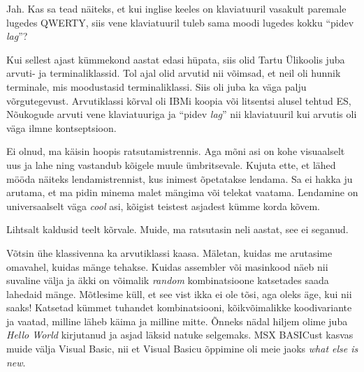 
Jah. Kas sa tead näiteks, et kui inglise keeles on klaviatuuril vasakult paremale lugedes 
QWERTY, siis vene klaviatuuril tuleb sama moodi lugedes kokku \enquote{pidev \emph{lag}}? 


Kui sellest ajast kümmekond aastat edasi hüpata, siis olid Tartu Ülikoolis juba arvuti- ja 
terminaliklassid. Tol ajal olid arvutid nii võimsad, et neil oli 
hunnik terminale, mis moodustasid terminaliklassi. Siis oli juba ka
väga palju võrgutegevust. Arvutiklassi kõrval oli 
IBMi koopia või litsentsi alusel tehtud ES, Nõukogude arvuti vene klaviatuuriga ja \enquote{pidev \emph{lag}} nii klaviatuuril kui arvutis oli väga ilmne kontseptsioon.


Ei olnud, ma käisin hoopis ratsutamistrennis. Aga mõni 
asi on kohe visuaalselt uus ja lahe ning vastandub 
kõigele muule ümbritsevale. Kujuta ette, et lähed mööda näiteks
lendamistrennist, kus inimest õpetatakse lendama. Sa ei hakka ju arutama, et ma pidin minema malet mängima või telekat vaatama. 
Lendamine on universaalselt väga \emph{cool} asi, kõigist 
teistest asjadest kümme korda kõvem.


Lihtsalt kaldusid teelt kõrvale. Muide, ma ratsutasin neli aastat, see ei seganud.

Võtsin ühe klassivenna ka arvutiklassi kaasa. Mäletan, kuidas me arutasime omavahel, kuidas mänge tehakse. Kuidas assembler või 
masinkood näeb nii suvaline välja ja äkki on 
võimalik \emph{random} kombinatsioone katsetades saada 
lahedaid mänge. Mõtlesime küll, et see vist ikka ei ole tõsi, 
aga oleks äge, kui nii saaks! Katsetad kümmet tuhandet 
kombinatsiooni, kõikvõimalikke koodivariante ja vaatad, milline läheb käima 
ja milline mitte. Õnneks nädal hiljem olime juba \emph{Hello 
World} kirjutanud ja asjad läksid natuke selgemaks. MSX 
BASICust kasvas muide välja Visual 
Basic, nii et Visual Basicu õppimine oli meie jaoks 
\emph{what else is new}.


